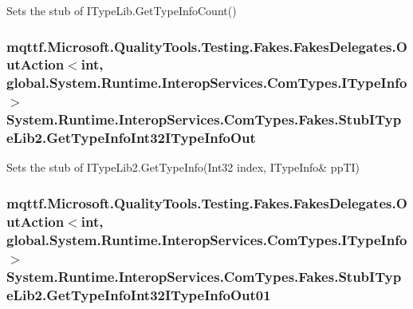 Sets the stub of I\-Type\-Lib.\-Get\-Type\-Info\-Count()

\hypertarget{class_system_1_1_runtime_1_1_interop_services_1_1_com_types_1_1_fakes_1_1_stub_i_type_lib2_afc4e6a7988caf99090527a460809b120}{
\subsubsection[{Get\-Type\-Info\-Int32\-I\-Type\-Info\-Out}]{\setlength{\rightskip}{0pt plus 5cm}mqttf.\-Microsoft.\-Quality\-Tools.\-Testing.\-Fakes.\-Fakes\-Delegates.\-Out\-Action$<$int, global.\-System.\-Runtime.\-Interop\-Services.\-Com\-Types.\-I\-Type\-Info$>$ System.\-Runtime.\-Interop\-Services.\-Com\-Types.\-Fakes.\-Stub\-I\-Type\-Lib2.\-Get\-Type\-Info\-Int32\-I\-Type\-Info\-Out}}\label{class_system_1_1_runtime_1_1_interop_services_1_1_com_types_1_1_fakes_1_1_stub_i_type_lib2_afc4e6a7988caf99090527a460809b120}


Sets the stub of I\-Type\-Lib2.\-Get\-Type\-Info(Int32 index, I\-Type\-Info\& pp\-T\-I)

\hypertarget{class_system_1_1_runtime_1_1_interop_services_1_1_com_types_1_1_fakes_1_1_stub_i_type_lib2_a8a9564cc07f25e773848d2dd2773b1d6}{
\subsubsection[{Get\-Type\-Info\-Int32\-I\-Type\-Info\-Out01}]{\setlength{\rightskip}{0pt plus 5cm}mqttf.\-Microsoft.\-Quality\-Tools.\-Testing.\-Fakes.\-Fakes\-Delegates.\-Out\-Action$<$int, global.\-System.\-Runtime.\-Interop\-Services.\-Com\-Types.\-I\-Type\-Info$>$ System.\-Runtime.\-Interop\-Services.\-Com\-Types.\-Fakes.\-Stub\-I\-Type\-Lib2.\-Get\-Type\-Info\-Int32\-I\-Type\-Info\-Out01}}\label{class_system_1_1_runtime_1_1_interop_services_1_1_com_types_1_1_fakes_1_1_stub_i_type_lib2_a8a9564cc07f25e773848d2dd2773b1d6}


